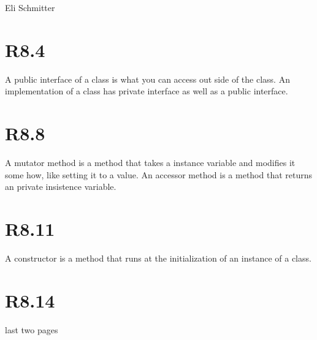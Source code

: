 \documentclass{article}
\begin{document}
\begin{flushleft}
  Eli Schmitter
\end{flushleft}
\section{R8.4}
A public interface of a class is what you can access out side of the class. An implementation of a class has private interface as well as a public interface.
\section{R8.8}
A mutator method is a method that takes a instance variable and modifies it some how, like setting it to a value. An accessor method is a method that returns an private insistence variable.

\section{R8.11}
A constructor is a method that runs at the initialization of an instance of a class.
\section{R8.14}
last two pages

\end{document}
